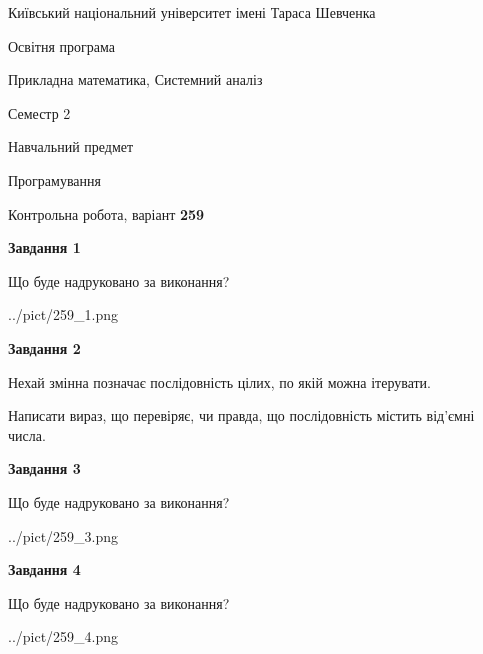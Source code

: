 \documentclass[12pt, ukrainian]{article}
\begin{document}
{{\begin {small}\par
{ \center  Київський національний університет імені Тараса Шевченка \par}
{\parbox {5 cm}{Освітня програма \hfill}{\parbox {8 cm}{Прикладна математика, Системний аналіз \hfill}}\parbox {5 cm}{\hfill Семестр 2}}\par
{\parbox {5 cm} {Навчальний предмет \hfill}\parbox {7 cm}{Програмування \hfill}\parbox {6cm}{\hfill}\par}\vspace{-7pt} \end{small}}{\center Контрольна робота, варіант  \No \textbf
{ 259 }\par}}
{
\begin {large}
{\begin {center}\textbf{Завдання 1}\end {center}}\par
Що буде надруковано за виконання?\par\par
\begin{center}
	{../pict/259_1.png}
\end{center}
\newpage

{\begin {center}\textbf{Завдання 2}\end {center}}\par
Нехай змінна  позначає послідовність цілих, по якій можна ітерувати.

Написати вираз, що перевіряє, чи правда, що послідовність  містить від’ємні числа.\par
\newpage

{\begin {center}\textbf{Завдання 3}\end {center}}\par
Що буде надруковано за виконання?
\begin{center}
	{../pict/259_3.png}
\end{center}
\newpage

{\begin {center}\textbf{Завдання 4}\end {center}}\par
Що буде надруковано за виконання?\par
\begin{center}
	{../pict/259_4.png}
\end{center}
\newpage


\end{large}}
\end{document}
